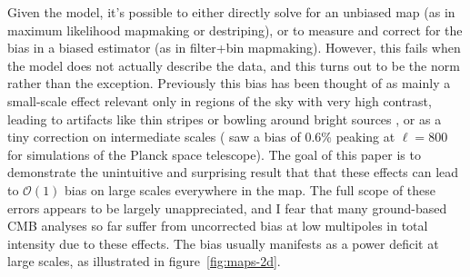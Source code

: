 \documentclass[twocolumn,apj]{aastex63}
\begin{document}
Given the model, it's possible to either directly solve for
an unbiased map (as in maximum likelihood mapmaking or destriping),
or to measure and correct for the bias in a biased estimator
(as in filter+bin mapmaking). However, this fails when the model
does not actually describe the data, and this turns out to be
the norm rather than the exception. Previously this bias has
been thought of as mainly a small-scale effect relevant only in
regions of the sky with very high contrast, leading to artifacts
like thin stripes or bowling around bright sources \citep{xgls-2017,model-error},
or as a tiny correction on intermediate scales (\citet{planck-ml-bias-2006}
saw a bias of 0.6\% peaking at $\ell=800$ for simulations of the Planck
space telescope). The goal of this paper is to
demonstrate the unintuitive and surprising result that that these effects
can lead to $\mathcal{O}(1)$ bias on large scales everywhere
in the map. The full scope of these errors appears to be largely
unappreciated, and I fear that many ground-based CMB analyses
so far suffer from uncorrected bias at low multipoles in total intensity
due to these effects. The bias usually manifests as a power
deficit at large scales, as illustrated in figure~\ref{fig:maps-2d}.
\end{document}
